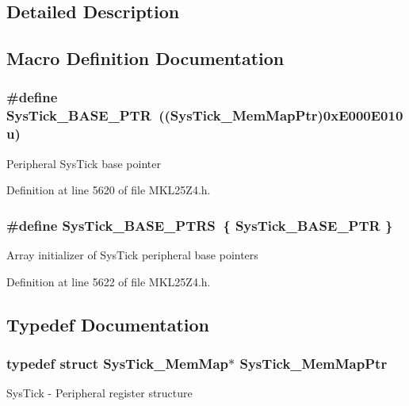 \subsection{Detailed Description}


\subsection{Macro Definition Documentation}
\subsubsection[{\texorpdfstring{Sys\+Tick\+\_\+\+B\+A\+S\+E\+\_\+\+P\+TR}{SysTick_BASE_PTR}}]{\setlength{\rightskip}{0pt plus 5cm}\#define Sys\+Tick\+\_\+\+B\+A\+S\+E\+\_\+\+P\+TR~(({\bf Sys\+Tick\+\_\+\+Mem\+Map\+Ptr})0x\+E000\+E010u)}\hypertarget{group___sys_tick___peripheral_gaeef73642fdef722ce658e468dad877ea}{}\label{group___sys_tick___peripheral_gaeef73642fdef722ce658e468dad877ea}
Peripheral Sys\+Tick base pointer 

Definition at line 5620 of file M\+K\+L25\+Z4.\+h.

\subsubsection[{\texorpdfstring{Sys\+Tick\+\_\+\+B\+A\+S\+E\+\_\+\+P\+T\+RS}{SysTick_BASE_PTRS}}]{\setlength{\rightskip}{0pt plus 5cm}\#define Sys\+Tick\+\_\+\+B\+A\+S\+E\+\_\+\+P\+T\+RS~\{ {\bf Sys\+Tick\+\_\+\+B\+A\+S\+E\+\_\+\+P\+TR} \}}\hypertarget{group___sys_tick___peripheral_ga0c9d5fa2fdb81e177e61d0e980507c51}{}\label{group___sys_tick___peripheral_ga0c9d5fa2fdb81e177e61d0e980507c51}
Array initializer of Sys\+Tick peripheral base pointers 

Definition at line 5622 of file M\+K\+L25\+Z4.\+h.



\subsection{Typedef Documentation}
\subsubsection[{\texorpdfstring{Sys\+Tick\+\_\+\+Mem\+Map\+Ptr}{SysTick_MemMapPtr}}]{\setlength{\rightskip}{0pt plus 5cm}typedef struct {\bf Sys\+Tick\+\_\+\+Mem\+Map}$\ast$ {\bf Sys\+Tick\+\_\+\+Mem\+Map\+Ptr}}\hypertarget{group___sys_tick___peripheral_ga19e2a0c9400dcdfd462a92ca83cff253}{}\label{group___sys_tick___peripheral_ga19e2a0c9400dcdfd462a92ca83cff253}
Sys\+Tick -\/ Peripheral register structure 